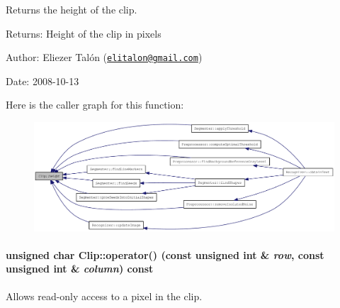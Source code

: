 Returns the height of the clip. 

\begin{Desc}
\item[Returns:]Height of the clip in pixels\end{Desc}
\begin{Desc}
\item[Author:]Eliezer Talón (\href{mailto:elitalon@gmail.com}{\tt elitalon@gmail.com}) \end{Desc}
\begin{Desc}
\item[Date:]2008-10-13 \end{Desc}


Here is the caller graph for this function:\nopagebreak
\begin{figure}[H]
\begin{center}
\leavevmode
\includegraphics[width=420pt]{class_clip_939908a8dde602d25335792cc0fd5d97_icgraph}
\end{center}
\end{figure}
\hypertarget{class_clip_16b24276181affc5086cb4fe83269fb8}{
\paragraph[{operator()}]{\setlength{\rightskip}{0pt plus 5cm}unsigned char Clip::operator() (const unsigned int \& {\em row}, \/  const unsigned int \& {\em column}) const}\hfill}
\label{class_clip_16b24276181affc5086cb4fe83269fb8}


Allows read-only access to a pixel in the clip. 

